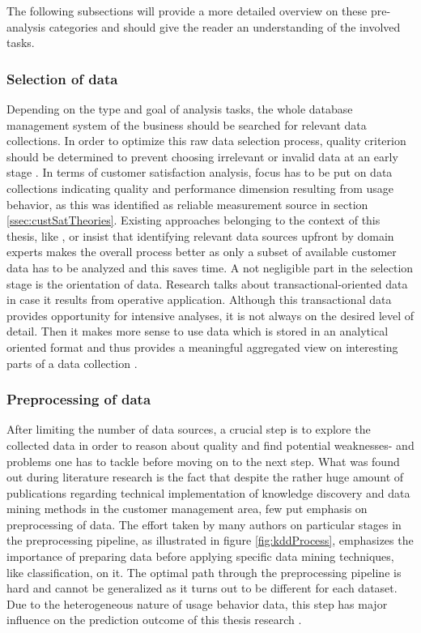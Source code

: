The following subsections will provide a more detailed overview on these pre-analysis categories and should give the reader an understanding of the involved tasks. 

\subsubsection{Selection of data}
\label{sssec:selectionData}
Depending on the type and goal of analysis tasks, the whole database management system of the business should be searched for relevant data collections. In order to optimize this raw data selection process, quality criterion should be determined to prevent choosing irrelevant or invalid data at an early stage \cite{mozer2000predicting} \cite{fayyad1996data}. In terms of customer satisfaction analysis, focus has to be put on data collections indicating quality and performance dimension resulting from usage behavior, as this was identified as reliable measurement source in section \ref{ssec:custSatTheories}. Existing approaches belonging to the context of this thesis, like \cite{mozer2000predicting}, \cite{meinzer2016can} or \cite{zhao2005customer} insist that identifying relevant data sources upfront by domain experts makes the overall process better as only a subset of available customer data has to be analyzed and this saves time. A not negligible part in the selection stage is the orientation of data. Research talks about transactional-oriented data in case it results from operative application. Although this transactional data provides opportunity for intensive analyses, it is not always on the desired level of detail. Then it makes more sense to use data which is stored in an analytical oriented format and thus provides a meaningful aggregated view on interesting parts of a data collection \cite{neckel2015}. 

\subsubsection{Preprocessing of data}
\label{sssec:explorationData}
After limiting the number of data sources, a crucial step is to explore the collected data in order to reason about quality and find potential weaknesses- and problems one has to tackle before moving on to the next step. What was found out during literature research is the fact that despite the rather huge amount of publications regarding technical implementation of knowledge discovery and data mining methods in the customer management area, few put emphasis on preprocessing of data. The effort taken by many authors on particular stages in the preprocessing pipeline, as illustrated in figure \ref{fig:kddProcess}, emphasizes the importance of preparing data before applying specific data mining techniques, like classification, on it. The optimal path through the preprocessing pipeline is hard and cannot be generalized as it turns out to be different for each dataset. Due to the heterogeneous nature of usage behavior data, this step has major influence on the prediction outcome of this thesis research \cite{fayyad1996data}. 

